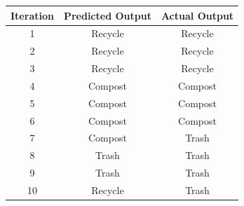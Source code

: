 \documentclass[12pt]{article}
\begin{document}
\vspace{0.2cm}

\small

\begin{center}
\begin{tabular}{|c|c|c|}
\hline
\textbf{Iteration} & \textbf{Predicted Output} & \textbf{Actual Output} \\ \hline

\rowcolor{green!20}
1 & Recycle & Recycle \\ \hline

\rowcolor{green!20}
2 & Recycle & Recycle \\ \hline

\rowcolor{green!20}
3 & Recycle & Recycle \\ \hline

\rowcolor{green!20}
4 & Compost & Compost \\ \hline

\rowcolor{green!20}
5 & Compost & Compost \\ \hline

\rowcolor{green!20}
6 & Compost & Compost \\ \hline

7 & Compost & Trash \\ \hline

\rowcolor{green!20}
8 & Trash & Trash \\ \hline

\rowcolor{green!20}
9 & Trash & Trash \\ \hline

10 & Recycle & Trash \\ \hline

\end{tabular}
\end{center}

\normalsize
\end{document}
